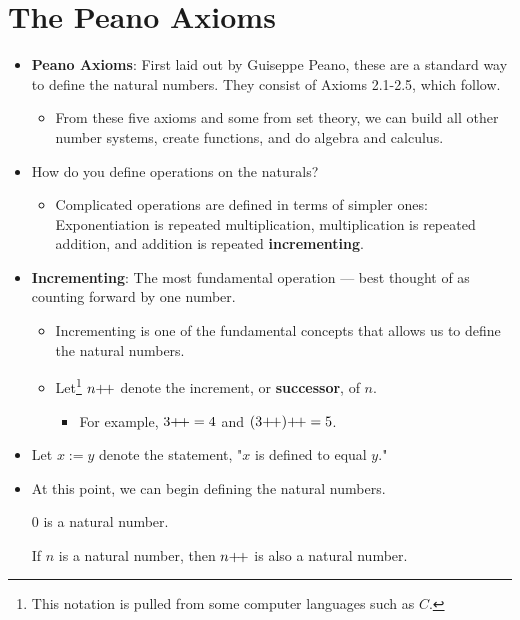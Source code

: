 \documentclass[../main.tex]{subfiles}
\begin{document}
\section{The Peano Axioms}
\begin{itemize}
    \item \textbf{Peano Axioms}: First laid out by Guiseppe Peano, these are a standard way to define the natural numbers. They consist of Axioms 2.1-2.5, which follow.
    \begin{itemize}
        \item From these five axioms and some from set theory, we can build all other number systems, create functions, and do algebra and calculus.
    \end{itemize}
    \item How do you define operations on the naturals?
    \begin{itemize}
        \item Complicated operations are defined in terms of simpler ones: Exponentiation is repeated multiplication, multiplication is repeated addition, and addition is repeated \textbf{incrementing}.
    \end{itemize}
    \item \textbf{Incrementing}: The most fundamental operation --- best thought of as counting forward by one number.
    \begin{itemize}
        \item Incrementing is one of the fundamental concepts that allows us to define the natural numbers.
        \item Let\footnote{This notation is pulled from some computer languages such as $C$.} $n{+\!+}$ denote the increment, or \textbf{successor}, of $n$.
        \begin{itemize}
            \item For example, $3{+\!+}=4$ and $(3{+\!+}){+\!+}=5$.
        \end{itemize}
    \end{itemize}
    \item Let $x:=y$ denote the statement, "$x$ is defined to equal $y$."
    \item At this point, we can begin defining the natural numbers.
    \begin{axm}\label{axm:0inN}
        0 is a natural number.
    \end{axm}
    \begin{axm}\label{axm:npplus}
        If $n$ is a natural number, then $n{+\!+}$ is also a natural number.

\end{axm}
\end{itemize}
\end{document}
